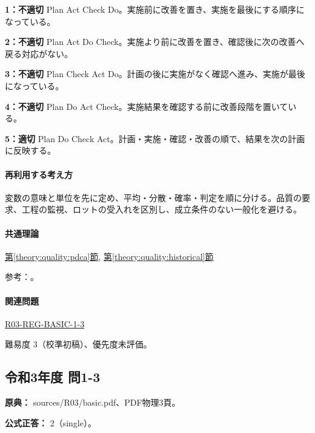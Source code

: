 \noindent\textbf{1：不適切} Plan Act Check Do。実施前に改善を置き、実施を最後にする順序になっている。\par

\noindent\textbf{2：不適切} Plan Act Do Check。実施より前に改善を置き、確認後に次の改善へ戻る対応がない。\par

\noindent\textbf{3：不適切} Plan Check Act Do。計画の後に実施がなく確認へ進み、実施が最後になっている。\par

\noindent\textbf{4：不適切} Plan Do Act Check。実施結果を確認する前に改善段階を置いている。\par

\noindent\textbf{5：適切} Plan Do Check Act。計画・実施・確認・改善の順で、結果を次の計画に反映する。\par

\paragraph{再利用する考え方} 変数の意味と単位を先に定め、平均・分散・確率・判定を順に分ける。品質の要求、工程の監視、ロットの受入れを区別し、成立条件のない一般化を避ける。

\paragraph{共通理論} \hyperref[theory:quality:pdca]{第\ref*{theory:quality:pdca}節}, \hyperref[theory:quality:historical]{第\ref*{theory:quality:historical}節}

\par 参考：\cite{quality_iso2008_guidance,quality_iso_process}。

\paragraph{関連問題} \hyperref[q:r03-reg-basic-1-3]{R03-REG-BASIC-1-3}

\par 難易度 3（校準初稿）、優先度未評価。

\subsection{令和3年度 問1-3}
\label{q:r03-reg-basic-1-3}

\noindent\textbf{原典：} sources/R03/basic.pdf、PDF物理3頁。

\textbf{公式正答：} 2（single）。

